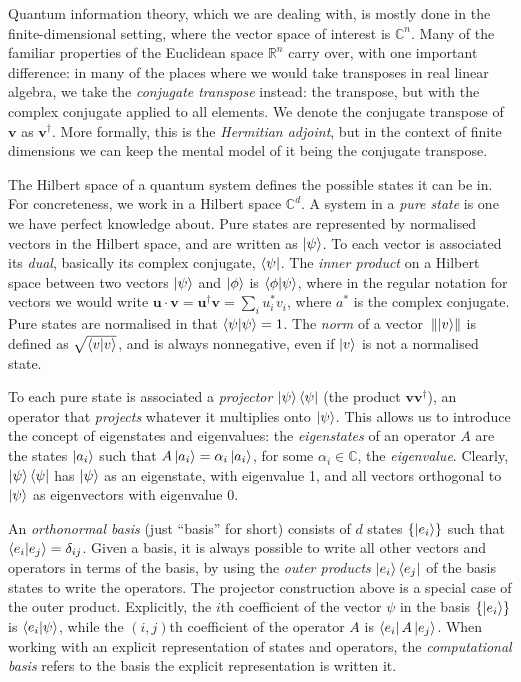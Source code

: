 \documentclass[10pt, a4paper]{article}
\numberwithin{equation}{section} %
\theoremstyle{definition}
\theoremstyle{plain}
\newcommand{\norm}[1]{\mathop{}\left\lVert#1\right\rVert}
\newcommand{\?}{\mathrel{?}} %
\newcommand{\R}{\mathbb{R}} %
\newcommand{\C}{\mathbb{C}} %
\newcommand{\cvec}[1]{\boldsymbol{\mathbf{#1}}}    %
\begin{document}
\begin{appendices}
                          Quantum information theory, which we are dealing with, is mostly done in the finite-dimensional setting, where the vector space of interest is \(\C^n\). Many of the familiar properties of the Euclidean space \(\R^n\) carry over, with one important difference: in many of the places where we would take transposes in real linear algebra, we take the \emph{conjugate transpose} instead: the transpose, but with the complex conjugate applied to all elements. We denote the conjugate transpose of \(\cvec{v}\) as \(\cvec{v}^{\dagger}\). More formally, this is the \emph{Hermitian adjoint}, but in the context of finite dimensions we can keep the mental model of it being the conjugate transpose.

                          The Hilbert space of a quantum system defines the possible states it can be in. For concreteness, we work in a Hilbert space \(\C^d\). A system in a \emph{pure state} is one we have perfect knowledge about. Pure states are represented by normalised vectors in the Hilbert space, and are written as \(\ket{\psi}\). To each vector is associated its \emph{dual}, basically its complex conjugate, \(\bra{\psi}\). The \emph{inner product} on a Hilbert space between two vectors \(\ket{\psi}\) and \(\ket{\phi}\) is \(\braket{\phi|\psi}\), where in the regular notation for vectors we would write \(\cvec{u} \cdot \cvec{v} = \cvec{u}^{\dagger}\cvec{v} = \sum_i u^*_i v_i\), where \(a^*\) is the complex conjugate. Pure states are normalised in that \(\braket{\psi|\psi}  = 1\). The \emph{norm} of a vector \(\norm{\ket{v}}\) is defined as \(\sqrt{\braket{v|v}}\), and is always nonnegative, even if \(\ket{v}\) is not a normalised state.

                          To each pure state is associated a \emph{projector} \(\ket{\psi}\bra{\psi}\) (the product \(\cvec{v}\cvec{v}^{\dagger}\)), an operator that \emph{projects} whatever it multiplies onto \(\ket{\psi}\). This allows us to introduce the concept of eigenstates and eigenvalues: the \emph{eigenstates} of an operator \(A\) are the states \(\ket{a_i}\) such that \(A\ket{a_i} = \alpha_i\ket{a_i}\), for some \(\alpha_i \in \C\), the \emph{eigenvalue}. Clearly, \(\ket{\psi}\bra{\psi}\) has \(\ket{\psi}\) as an eigenstate, with eigenvalue 1, and all vectors orthogonal to \(\ket{\psi}\) as eigenvectors with eigenvalue 0.

                          An \emph{orthonormal basis} (just ``basis'' for short) consists of \(d\) states \(\{\ket{e_i}\}\) such that \(\braket{e_i|e_j} = \delta_{ij}\). Given a basis, it is always possible to write all other vectors and operators in terms of the basis, by using the \emph{outer products} \(\ket{e_i}\bra{e_j}\) of the basis states to write the operators. The projector construction above is a special case of the outer product. Explicitly, the \(i\)th coefficient of the vector \(\psi\) in the basis \(\{\ket{e_i}\}\) is \(\braket{e_i|\psi}\), while the \((i,j)\)th coefficient of the operator \(A\) is \(\bra{e_i}A\ket{e_j}\). When working with an explicit representation of states and operators, the \emph{computational basis} refers to the basis the explicit representation is written it.


\end{appendices}
\end{document}
